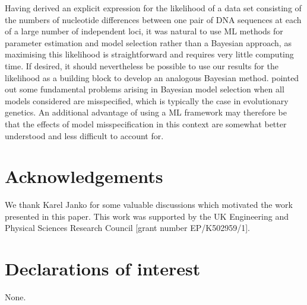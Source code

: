 \documentclass[11pt]{article}
\begin{document}
{\color{red} 
Having derived an explicit expression for the likelihood of a data set consisting of the numbers of nucleotide differences between one pair of DNA sequences at each of a large number of independent loci, it was natural to use ML methods for parameter estimation and model selection rather than a Bayesian approach, as maximising this likelihood is straightforward and requires very little computing time. 
If desired, it should nevertheless be possible to use our results for the likelihood as a building block to develop an analogous Bayesian method. 
\citet{Yang2018} pointed out some fundamental problems arising in Bayesian model selection when all models considered are misspecified, which is typically the case in evolutionary genetics. An additional advantage of using a ML framework may therefore be that the effects of model misspecification in this context are somewhat better understood and less difficult to account for.
} 

\section*{Acknowledgements}

We thank Karel Janko for some valuable discussions which motivated the work presented in this paper.
This work was supported by the UK Engineering and Physical Sciences Research Council [grant number EP/K502959/1]. 

\section*{Declarations of interest} 
None.

\newpage



\end{document}
